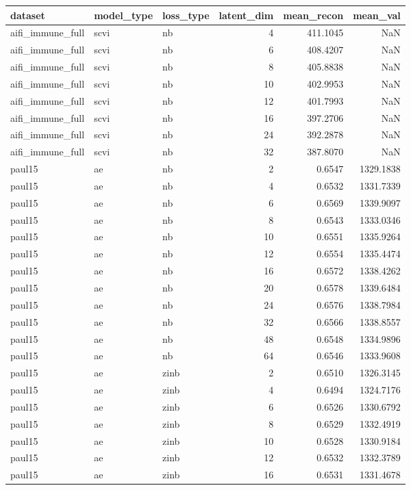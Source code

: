 \begin{tabular}{lllrrr}
\toprule
dataset & model\_type & loss\_type & latent\_dim & mean\_recon & mean\_val \\
\midrule
aifi\_immune\_full & scvi & nb & 4 & 411.1045 & NaN \\
aifi\_immune\_full & scvi & nb & 6 & 408.4207 & NaN \\
aifi\_immune\_full & scvi & nb & 8 & 405.8838 & NaN \\
aifi\_immune\_full & scvi & nb & 10 & 402.9953 & NaN \\
aifi\_immune\_full & scvi & nb & 12 & 401.7993 & NaN \\
aifi\_immune\_full & scvi & nb & 16 & 397.2706 & NaN \\
aifi\_immune\_full & scvi & nb & 24 & 392.2878 & NaN \\
aifi\_immune\_full & scvi & nb & 32 & 387.8070 & NaN \\
paul15 & ae & nb & 2 & 0.6547 & 1329.1838 \\
paul15 & ae & nb & 4 & 0.6532 & 1331.7339 \\
paul15 & ae & nb & 6 & 0.6569 & 1339.9097 \\
paul15 & ae & nb & 8 & 0.6543 & 1333.0346 \\
paul15 & ae & nb & 10 & 0.6551 & 1335.9264 \\
paul15 & ae & nb & 12 & 0.6554 & 1335.4474 \\
paul15 & ae & nb & 16 & 0.6572 & 1338.4262 \\
paul15 & ae & nb & 20 & 0.6578 & 1339.6484 \\
paul15 & ae & nb & 24 & 0.6576 & 1338.7984 \\
paul15 & ae & nb & 32 & 0.6566 & 1338.8557 \\
paul15 & ae & nb & 48 & 0.6548 & 1334.9896 \\
paul15 & ae & nb & 64 & 0.6546 & 1333.9608 \\
paul15 & ae & zinb & 2 & 0.6510 & 1326.3145 \\
paul15 & ae & zinb & 4 & 0.6494 & 1324.7176 \\
paul15 & ae & zinb & 6 & 0.6526 & 1330.6792 \\
paul15 & ae & zinb & 8 & 0.6529 & 1332.4919 \\
paul15 & ae & zinb & 10 & 0.6528 & 1330.9184 \\
paul15 & ae & zinb & 12 & 0.6532 & 1332.3789 \\
paul15 & ae & zinb & 16 & 0.6531 & 1331.4678 \\

\end{tabular}
